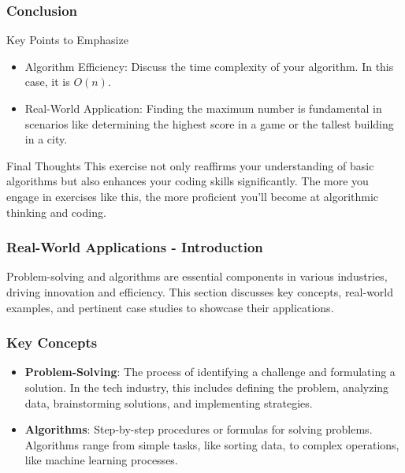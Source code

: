 \documentclass{beamer}
\begin{document}
\begin{frame}[fragile]
    \frametitle{Conclusion}
    \begin{block}{Key Points to Emphasize}
        \begin{itemize}
            \item Algorithm Efficiency: Discuss the time complexity of your algorithm. In this case, it is \(O(n)\).
            \item Real-World Application: Finding the maximum number is fundamental in scenarios like determining the highest score in a game or the tallest building in a city.
        \end{itemize}
    \end{block}
    
    \begin{block}{Final Thoughts}
        This exercise not only reaffirms your understanding of basic algorithms but also enhances your coding skills significantly. The more you engage in exercises like this, the more proficient you'll become at algorithmic thinking and coding.
    \end{block}
\end{frame}

\begin{frame}[fragile]
    \frametitle{Real-World Applications - Introduction}
    Problem-solving and algorithms are essential components in various industries, driving innovation and efficiency. This section discusses key concepts, real-world examples, and pertinent case studies to showcase their applications.
\end{frame}

\begin{frame}[fragile]
    \frametitle{Key Concepts}
    \begin{itemize}
        \item \textbf{Problem-Solving}: 
        The process of identifying a challenge and formulating a solution. 
        In the tech industry, this includes defining the problem, analyzing data, brainstorming solutions, and implementing strategies.
        
        \item \textbf{Algorithms}: 
        Step-by-step procedures or formulas for solving problems. Algorithms range from simple tasks, like sorting data, to complex operations, like machine learning processes.
    \end{itemize}
\end{frame}
\end{document}
